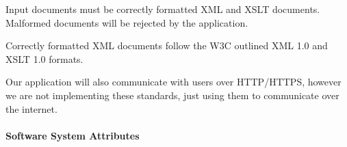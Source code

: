 Input documents must be correctly formatted XML and XSLT documents.
Malformed documents will be rejected by the application.

Correctly formatted XML documents follow the W3C outlined XML 1.0 and XSLT 1.0 formats. \cite{xml-spec} \cite{xslt-spec}


Our application will also communicate with users over HTTP/HTTPS, however we are not implementing these standards, just using them to communicate over the internet.


\paragraph{Software System Attributes}

